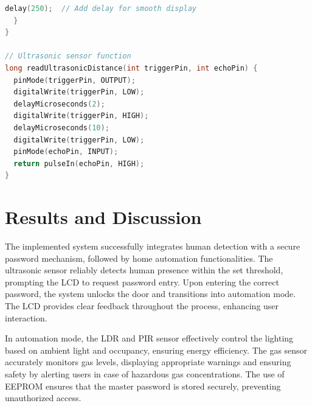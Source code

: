\documentclass[a4paper,12pt]{article}
\begin{document}
\begin{lstlisting}[language=C++, caption={Arduino Code for Smart Home Automation and Security System}]
    delay(250);  // Add delay for smooth display
  }
}

// Ultrasonic sensor function
long readUltrasonicDistance(int triggerPin, int echoPin) {
  pinMode(triggerPin, OUTPUT);
  digitalWrite(triggerPin, LOW);
  delayMicroseconds(2);
  digitalWrite(triggerPin, HIGH);
  delayMicroseconds(10);
  digitalWrite(triggerPin, LOW);
  pinMode(echoPin, INPUT);
  return pulseIn(echoPin, HIGH);
}
\end{lstlisting}

\section{Results and Discussion}
The implemented system successfully integrates human detection with a secure password mechanism, followed by home automation functionalities. The ultrasonic sensor reliably detects human presence within the set threshold, prompting the LCD to request password entry. Upon entering the correct password, the system unlocks the door and transitions into automation mode. The LCD provides clear feedback throughout the process, enhancing user interaction.

In automation mode, the LDR and PIR sensor effectively control the lighting based on ambient light and occupancy, ensuring energy efficiency. The gas sensor accurately monitors gas levels, displaying appropriate warnings and ensuring safety by alerting users in case of hazardous gas concentrations. The use of EEPROM ensures that the master password is stored securely, preventing unauthorized access.

\makeatletter
\renewcommand{\thesubfigure}{\@alph\c@subfigure} %
\setcounter{subfigure}{0} %
\end{document}
